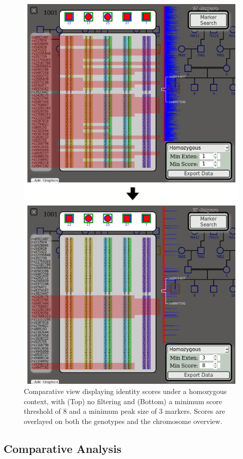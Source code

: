 \documentclass{bioinfo}
\numberwithin{equation}{section}
\begin{document}
\begin{methods}
\begin{figure}[!tpb]
	\centerline{\includegraphics[scale=1]{homology.4.eps}}\caption{Comparative view displaying identity scores under a homozygous context, with (Top) no filtering and (Bottom) a minimum score threshold of 8 and a minimum peak size of 3 markers. Scores are overlayed on both the genotypes and the chromosome overview.}\label{fig:homology}
\end{figure}



\subsection{Comparative Analysis}


\end{methods}
\end{document}
